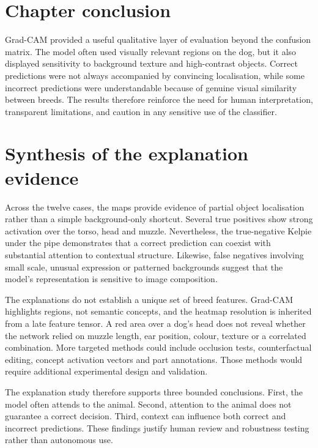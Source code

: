 \section{Chapter conclusion}

Grad-CAM provided a useful qualitative layer of evaluation beyond the confusion matrix. The model often used visually relevant regions on the dog, but it also displayed sensitivity to background texture and high-contrast objects. Correct predictions were not always accompanied by convincing localisation, while some incorrect predictions were understandable because of genuine visual similarity between breeds. The results therefore reinforce the need for human interpretation, transparent limitations, and caution in any sensitive use of the classifier.

\section{Synthesis of the explanation evidence}
Across the twelve cases, the maps provide evidence of partial object localisation rather than a simple background-only shortcut. Several true positives show strong activation over the torso, head and muzzle. Nevertheless, the true-negative Kelpie under the pipe demonstrates that a correct prediction can coexist with substantial attention to contextual structure. Likewise, false negatives involving small scale, unusual expression or patterned backgrounds suggest that the model's representation is sensitive to image composition.

The explanations do not establish a unique set of breed features. Grad-CAM highlights regions, not semantic concepts, and the heatmap resolution is inherited from a late feature tensor. A red area over a dog's head does not reveal whether the network relied on muzzle length, ear position, colour, texture or a correlated combination. More targeted methods could include occlusion tests, counterfactual editing, concept activation vectors and part annotations. Those methods would require additional experimental design and validation.

The explanation study therefore supports three bounded conclusions. First, the model often attends to the animal. Second, attention to the animal does not guarantee a correct decision. Third, context can influence both correct and incorrect predictions. These findings justify human review and robustness testing rather than autonomous use.
